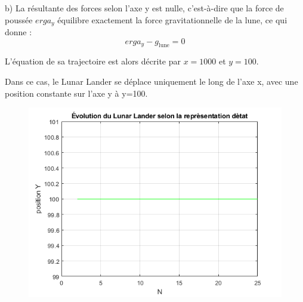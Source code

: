 \documentclass[14pt]{extarticle}
\begin{document}
b) La résultante des forces selon l'axe y est nulle, c'est-à-dire que la force de poussée $erga_y$ équilibre exactement la force gravitationnelle de la lune, ce qui donne :
\[erga_y - g_{\text{lune}} = 0\]

L'équation de sa trajectoire est alors décrite par $x =  1000$ et $y = 100$.

Dans ce cas, le Lunar Lander se déplace uniquement le long de l'axe x, avec une position constante sur l'axe y à y=100.
\begin{figure} [tbh]
    \vspace{0.1cm}
        \centering
        \includegraphics[width=\columnwidth]{"images/q10_2.png"}
    
\end{figure}
\end{document}
